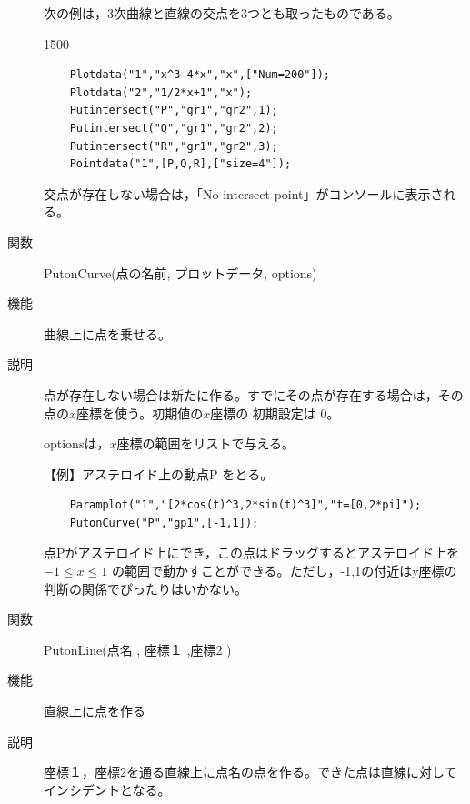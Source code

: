 \documentclass[papersize,a4paper,12pt,uplatex]{jsarticle}
\begin{document}
\begin{description}
次の例は，3次曲線と直線の交点を3つとも取ったものである。

\begin{layer}{150}{0}
\end{layer}

\begin{verbatim}
    Plotdata("1","x^3-4*x","x",["Num=200"]);
    Plotdata("2","1/2*x+1","x");
    Putintersect("P","gr1","gr2",1);
    Putintersect("Q","gr1","gr2",2);
    Putintersect("R","gr1","gr2",3);
    Pointdata("1",[P,Q,R],["size=4"]);
\end{verbatim}
 交点が存在しない場合は，「No intersect point」がコンソールに表示される。

\vspace{\baselineskip}
\hypertarget{putoncurve}{}
\item[関数]  PutonCurve(点の名前, プロットデータ, options)
\item[機能]  曲線上に点を乗せる。
\item[説明]  点が存在しない場合は新たに作る。すでにその点が存在する場合は，その点の$x$座標を使う。初期値の$x$座標の 初期設定は 0。

optionsは，$x$座標の範囲をリストで与える。

\vspace{\baselineskip}
【例】アステロイド上の動点P をとる。
\begin{verbatim}
    Paramplot("1","[2*cos(t)^3,2*sin(t)^3]","t=[0,2*pi]");
    PutonCurve("P","gp1",[-1,1]); 
\end{verbatim}
点Pがアステロイド上にでき，この点はドラッグするとアステロイド上を $-1 \leq x\leq 1$ の範囲で動かすことができる。ただし，-1,1の付近はy座標の判断の関係でぴったりはいかない。

 \begin{center}  \end{center}


\vspace{\baselineskip}
\hypertarget{putonline}{}
\item[関数]  PutonLine(点名 , 座標１ ,座標2 )
\item[機能]  直線上に点を作る
\item[説明]  座標１，座標2を通る直線上に点名の点を作る。できた点は直線に対してインシデントとなる。


\end{description}
\end{document}
